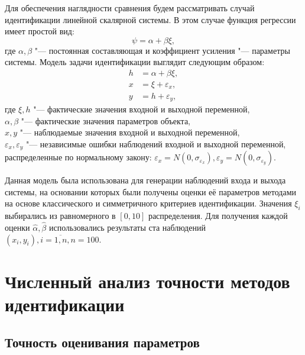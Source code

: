 Для обеспечения наглядности сравнения будем рассматривать случай
идентификации линейной скалярной системы.
В этом случае функция регрессии имеет простой вид:
\begin{equation}
  \psi = \alpha + \beta \xi,
  \label{eq:linear_fun_scalar}
\end{equation}
где \( \alpha, \beta \) "--- постоянная составляющая и коэффициент усиления "---
параметры системы. Модель задачи идентификации выглядит следующим образом:
\begin{equation}
  \label{eq:linear_model_scalar}
  \begin{aligned}
  h &= \alpha + \beta \xi, \\
  x &= \xi + \varepsilon_x, \\
  y &= h + \varepsilon_y,
  \end{aligned}
\end{equation}
где \( \xi, h \) "--- фактические значения входной и выходной переменной, \\
\hspace*{6mm} \( \alpha, \beta \) "--- фактические значения параметров объекта, \\
\hspace*{6mm} \( x, y \) "--- наблюдаемые значения входной и выходной переменной, \\
\hspace*{6mm} \( \varepsilon_x, \varepsilon_y \) "--- независимые ошибки наблюдений
входной и выходной переменной, распределенные по нормальному закону:
\(
\varepsilon_x = N(0, \sigma_{\varepsilon_x}),
\varepsilon_y = N(0, \sigma_{\varepsilon_y})
\).

Данная модель была использована для генерации наблюдений входа и выхода системы,
на основании которых были получены оценки её параметров методами на основе
классического и симметричного критериев идентификации.
Значения \( \xi_i \) выбирались из равномерного в \( [0, 10] \) распределения.
Для получения каждой оценки \( \hat{\alpha}, \hat{\beta} \) использовались результаты
ста наблюдений \( ( x_i, y_i ), i = \overline{1, n}, n = 100 \).

\section{Численный анализ точности методов идентификации}

\subsection{Точность оценивания параметров}

